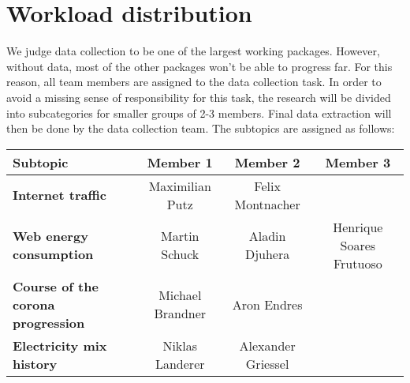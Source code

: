 \documentclass[s=english,inputenc=utf8,fontsize=10pt]{ldvarticle}
\begin{document}
\section{Workload distribution}

We judge data collection to be one of the largest working packages. However, without data, most of the other packages won't be able to progress far. For this reason, all team members are assigned to the data collection task. In order to avoid a missing sense of responsibility for this task, the research will be divided into subcategories for smaller groups of 2-3 members. Final data extraction will then be done by the data collection team.
The subtopics are assigned as follows:
\begin{table}[h]
	\begin{center}
		\begin{tabular}{l|ccc} %
			\textbf{Subtopic} & Member 1 & Member 2 & Member 3\\
			\hline
			\textbf{Internet traffic} & Maximilian Putz & Felix Montnacher &\\
			\textbf{Web energy consumption} & Martin Schuck & Aladin Djuhera & Henrique Soares Frutuoso\\
			\textbf{Course of the corona progression} & Michael Brandner & Aron Endres &\\
			\textbf{Electricity mix history} & Niklas Landerer & Alexander Griessel &\\
		\end{tabular}
	\end{center}
\end{table}
\end{document}
